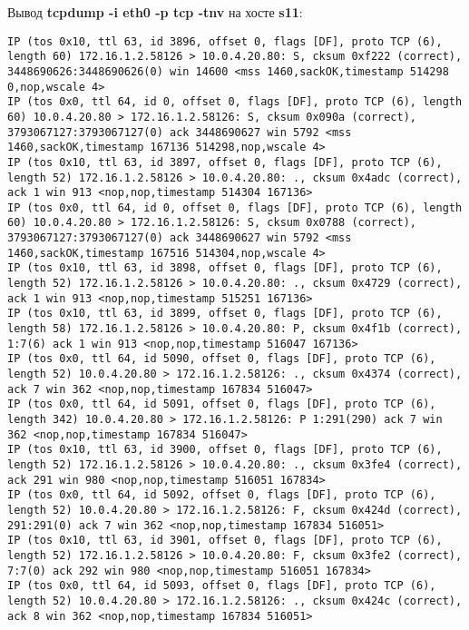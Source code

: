 \documentclass[a4paper,12pt]{article}
\begin{document}
Вывод \textbf{tcpdump -i eth0 -p tcp -tnv} на хосте \textbf{s11}:
\begin{Verbatim}
IP (tos 0x10, ttl 63, id 3896, offset 0, flags [DF], proto TCP (6), length 60) 172.16.1.2.58126 > 10.0.4.20.80: S, cksum 0xf222 (correct), 3448690626:3448690626(0) win 14600 <mss 1460,sackOK,timestamp 514298 0,nop,wscale 4>
IP (tos 0x0, ttl 64, id 0, offset 0, flags [DF], proto TCP (6), length 60) 10.0.4.20.80 > 172.16.1.2.58126: S, cksum 0x090a (correct), 3793067127:3793067127(0) ack 3448690627 win 5792 <mss 1460,sackOK,timestamp 167136 514298,nop,wscale 4>
IP (tos 0x10, ttl 63, id 3897, offset 0, flags [DF], proto TCP (6), length 52) 172.16.1.2.58126 > 10.0.4.20.80: ., cksum 0x4adc (correct), ack 1 win 913 <nop,nop,timestamp 514304 167136>
IP (tos 0x0, ttl 64, id 0, offset 0, flags [DF], proto TCP (6), length 60) 10.0.4.20.80 > 172.16.1.2.58126: S, cksum 0x0788 (correct), 3793067127:3793067127(0) ack 3448690627 win 5792 <mss 1460,sackOK,timestamp 167516 514304,nop,wscale 4>
IP (tos 0x10, ttl 63, id 3898, offset 0, flags [DF], proto TCP (6), length 52) 172.16.1.2.58126 > 10.0.4.20.80: ., cksum 0x4729 (correct), ack 1 win 913 <nop,nop,timestamp 515251 167136>
IP (tos 0x10, ttl 63, id 3899, offset 0, flags [DF], proto TCP (6), length 58) 172.16.1.2.58126 > 10.0.4.20.80: P, cksum 0x4f1b (correct), 1:7(6) ack 1 win 913 <nop,nop,timestamp 516047 167136>
IP (tos 0x0, ttl 64, id 5090, offset 0, flags [DF], proto TCP (6), length 52) 10.0.4.20.80 > 172.16.1.2.58126: ., cksum 0x4374 (correct), ack 7 win 362 <nop,nop,timestamp 167834 516047>
IP (tos 0x0, ttl 64, id 5091, offset 0, flags [DF], proto TCP (6), length 342) 10.0.4.20.80 > 172.16.1.2.58126: P 1:291(290) ack 7 win 362 <nop,nop,timestamp 167834 516047>
IP (tos 0x10, ttl 63, id 3900, offset 0, flags [DF], proto TCP (6), length 52) 172.16.1.2.58126 > 10.0.4.20.80: ., cksum 0x3fe4 (correct), ack 291 win 980 <nop,nop,timestamp 516051 167834>
IP (tos 0x0, ttl 64, id 5092, offset 0, flags [DF], proto TCP (6), length 52) 10.0.4.20.80 > 172.16.1.2.58126: F, cksum 0x424d (correct), 291:291(0) ack 7 win 362 <nop,nop,timestamp 167834 516051>
IP (tos 0x10, ttl 63, id 3901, offset 0, flags [DF], proto TCP (6), length 52) 172.16.1.2.58126 > 10.0.4.20.80: F, cksum 0x3fe2 (correct), 7:7(0) ack 292 win 980 <nop,nop,timestamp 516051 167834>
IP (tos 0x0, ttl 64, id 5093, offset 0, flags [DF], proto TCP (6), length 52) 10.0.4.20.80 > 172.16.1.2.58126: ., cksum 0x424c (correct), ack 8 win 362 <nop,nop,timestamp 167834 516051>
\end{Verbatim}
\end{document}
